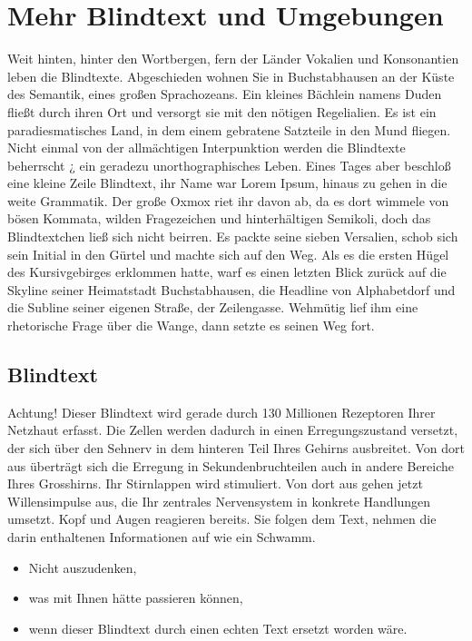 \documentclass[a4paper,parskip=half,oneside]{scrbook}
\begin{document}
\chapter{Mehr Blindtext und Umgebungen}
Weit hinten, hinter den Wortbergen, fern der L\"ander Vokalien und Konsonantien leben die Blindtexte. Abgeschieden wohnen Sie in Buchstabhausen an der Küste des Semantik, eines gro\ss{}en Sprachozeans. Ein kleines B\"achlein namens Duden flie\ss{}t durch ihren Ort und versorgt sie mit den nötigen Regelialien. Es ist ein paradiesmatisches Land, in dem einem gebratene Satzteile in den Mund fliegen. Nicht einmal von der allm\"achtigen Interpunktion werden die Blindtexte beherrscht ¿ ein geradezu unorthographisches Leben. Eines Tages aber beschlo\ss{} eine kleine Zeile Blindtext, ihr Name war Lorem Ipsum, hinaus zu gehen in die weite Grammatik. Der gro\ss{}e Oxmox riet ihr davon ab, da es dort wimmele von bösen Kommata, wilden Fragezeichen und hinterh\"altigen Semikoli, doch das Blindtextchen lie\ss{} sich nicht beirren. Es packte seine sieben Versalien, schob sich sein Initial in den Gürtel und machte sich auf den Weg. Als es die ersten Hügel des Kursivgebirges erklommen hatte, warf es einen letzten Blick zurück auf die Skyline seiner Heimatstadt Buchstabhausen, die Headline von Alphabetdorf und die Subline seiner eigenen Stra\ss{}e, der Zeilengasse. Wehmütig lief ihm eine rhetorische Frage über die Wange, dann setzte es seinen Weg fort.

\section{Blindtext}
Achtung! Dieser Blindtext wird gerade durch 130 Millionen Rezeptoren Ihrer Netzhaut erfasst. Die Zellen werden dadurch in einen Erregungszustand versetzt, der sich über den Sehnerv in dem hinteren Teil Ihres Gehirns ausbreitet. Von dort aus übertr\"agt sich die Erregung in Sekundenbruchteilen auch in andere Bereiche Ihres Grosshirns. Ihr Stirnlappen wird stimuliert. Von dort aus gehen jetzt Willensimpulse aus, die Ihr zentrales Nervensystem in konkrete Handlungen umsetzt. Kopf und Augen reagieren bereits. Sie folgen dem Text, nehmen die darin enthaltenen Informationen auf wie ein Schwamm.

\begin{itemize}
  \item Nicht auszudenken,
  \item was mit Ihnen h\"atte passieren können,
  \item wenn dieser Blindtext durch einen echten Text ersetzt worden w\"are.
\end{itemize}
\end{document}
